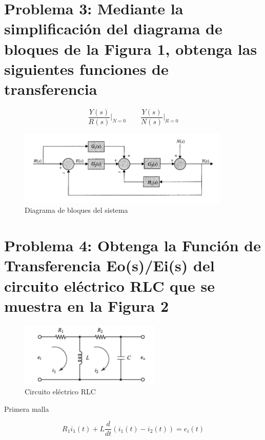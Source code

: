 \documentclass[10pt]{article}
\theoremstyle{definition}
\theoremstyle{remark}
\theoremstyle{definition}
\numberwithin{equation}{prob}
\begin{document}
\newpage

\section{Problema 3: Mediante la simplificación del diagrama de bloques de la Figura 1, obtenga las siguientes funciones de transferencia}

\[
	\frac{Y(s)}{R(s)} \bigg|_{N=0}
	\quad \quad
	\frac{Y(s)}{N(s)} \bigg|_{R=0}
\]

\begin{figure}[h]
	\centering
	\includegraphics[width=0.9\textwidth]{./figures/Figura 1 ejercicio 3.png}
	\caption{Diagrama de bloques del sistema}
\end{figure}

\section{Problema 4: Obtenga la Función de Transferencia Eo(s)/Ei(s) del circuito eléctrico RLC que se muestra en
  la Figura 2}

\begin{figure}[h]
	\centering
	\includegraphics[width=0.6\textwidth]{./figures/Figura 2 ejercicio 4.png}
	\caption{Circuito eléctrico RLC}
\end{figure}
Primera malla

\[R_1 i_1(t) + L \frac{d}{dt} \left( i_1(t) - i_2(t) \right) = e_i(t)
\]
\end{document}
